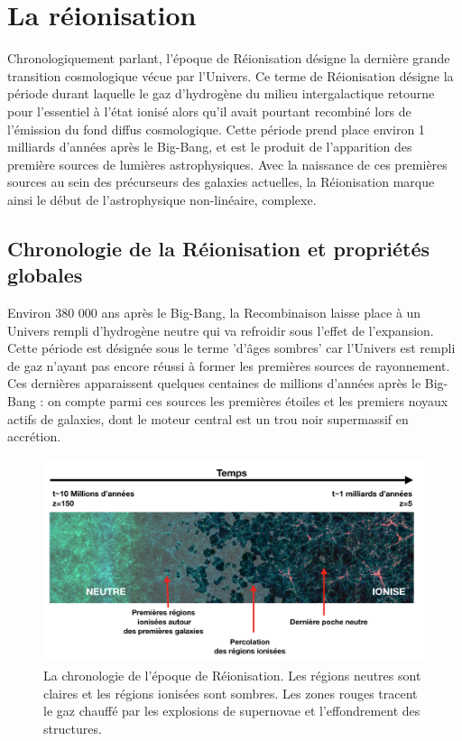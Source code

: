 \chapter{La réionisation}

Chronologiquement parlant, l'époque de Réionisation désigne la dernière grande transition cosmologique vécue par l'Univers. Ce terme de Réionisation désigne la période durant laquelle le gaz d'hydrogène du milieu intergalactique retourne pour l'essentiel à l'état ionisé alors qu'il avait pourtant recombiné lors de l'émission du fond diffus cosmologique. Cette période prend place environ 1 milliards d'années après le Big-Bang, et est le produit de l'apparition des première sources de lumières astrophysiques. Avec la naissance de ces premières sources au sein des précurseurs des galaxies actuelles, la Réionisation marque ainsi le début de l'astrophysique non-linéaire, complexe.

\section{Chronologie de la Réionisation et propriétés globales}
Environ 380 000 ans après le Big-Bang, la Recombinaison laisse place à un Univers rempli d'hydrogène neutre qui va refroidir sous l'effet de l'expansion. Cette période est désignée sous le terme 'd'âges sombres' car l'Univers est rempli de gaz n'ayant pas encore réussi à former les premières sources de rayonnement. Ces dernières apparaissent quelques centaines de millions d'années après le Big-Bang : on compte parmi ces sources les premières étoiles et les premiers noyaux actifs de galaxies, dont le moteur central est un trou noir supermassif en accrétion.

\begin{figure}[htbp]
	\centering
		\includegraphics[height=6cm]{figs/frisereion.png}
		\caption[Chronologie de la Réionisation]{La chronologie de l'époque de Réionisation. Les régions neutres sont claires et les régions ionisées sont sombres. Les zones rouges tracent le gaz chauffé par les explosions de supernovae et l'effondrement des structures.}
	\label{f:frisereion}
\end{figure}

